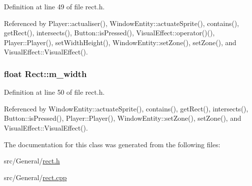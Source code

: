 Definition at line 49 of file rect.\-h.



Referenced by Player\-::actualiser(), Window\-Entity\-::actuate\-Sprite(), contains(), get\-Rect(), intersects(), Button\-::is\-Pressed(), Visual\-Effect\-::operator()(), Player\-::\-Player(), set\-Width\-Height(), Window\-Entity\-::set\-Zone(), set\-Zone(), and Visual\-Effect\-::\-Visual\-Effect().

\hypertarget{class_rect_a2c4d58cb6e4d113e486913f62f47b558}{
\subsubsection[{m\-\_\-width}]{\setlength{\rightskip}{0pt plus 5cm}float Rect\-::m\-\_\-width\hspace{0.3cm}{\ttfamily [protected]}}}\label{class_rect_a2c4d58cb6e4d113e486913f62f47b558}


Definition at line 50 of file rect.\-h.



Referenced by Window\-Entity\-::actuate\-Sprite(), contains(), get\-Rect(), intersects(), Button\-::is\-Pressed(), Player\-::\-Player(), Window\-Entity\-::set\-Zone(), set\-Zone(), and Visual\-Effect\-::\-Visual\-Effect().



The documentation for this class was generated from the following files\-:\begin{DoxyCompactItemize}
\item 
src/\-General/\hyperlink{rect_8h}{rect.\-h}\item 
src/\-General/\hyperlink{rect_8cpp}{rect.\-cpp}\end{DoxyCompactItemize}
